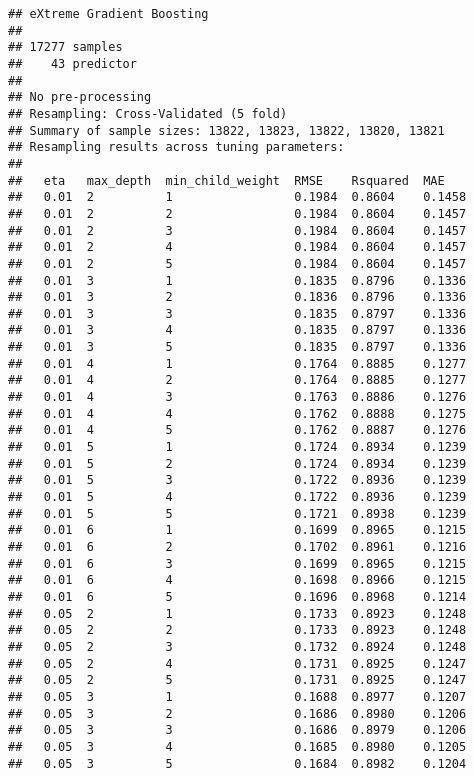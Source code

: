 \documentclass[]{article}
\begin{document}
\begin{verbatim}
## eXtreme Gradient Boosting 
## 
## 17277 samples
##    43 predictor
## 
## No pre-processing
## Resampling: Cross-Validated (5 fold) 
## Summary of sample sizes: 13822, 13823, 13822, 13820, 13821 
## Resampling results across tuning parameters:
## 
##   eta   max_depth  min_child_weight  RMSE    Rsquared  MAE   
##   0.01  2          1                 0.1984  0.8604    0.1458
##   0.01  2          2                 0.1984  0.8604    0.1457
##   0.01  2          3                 0.1984  0.8604    0.1457
##   0.01  2          4                 0.1984  0.8604    0.1457
##   0.01  2          5                 0.1984  0.8604    0.1457
##   0.01  3          1                 0.1835  0.8796    0.1336
##   0.01  3          2                 0.1836  0.8796    0.1336
##   0.01  3          3                 0.1835  0.8797    0.1336
##   0.01  3          4                 0.1835  0.8797    0.1336
##   0.01  3          5                 0.1835  0.8797    0.1336
##   0.01  4          1                 0.1764  0.8885    0.1277
##   0.01  4          2                 0.1764  0.8885    0.1277
##   0.01  4          3                 0.1763  0.8886    0.1276
##   0.01  4          4                 0.1762  0.8888    0.1275
##   0.01  4          5                 0.1762  0.8887    0.1276
##   0.01  5          1                 0.1724  0.8934    0.1239
##   0.01  5          2                 0.1724  0.8934    0.1239
##   0.01  5          3                 0.1722  0.8936    0.1239
##   0.01  5          4                 0.1722  0.8936    0.1239
##   0.01  5          5                 0.1721  0.8938    0.1239
##   0.01  6          1                 0.1699  0.8965    0.1215
##   0.01  6          2                 0.1702  0.8961    0.1216
##   0.01  6          3                 0.1699  0.8965    0.1215
##   0.01  6          4                 0.1698  0.8966    0.1215
##   0.01  6          5                 0.1696  0.8968    0.1214
##   0.05  2          1                 0.1733  0.8923    0.1248
##   0.05  2          2                 0.1733  0.8923    0.1248
##   0.05  2          3                 0.1732  0.8924    0.1248
##   0.05  2          4                 0.1731  0.8925    0.1247
##   0.05  2          5                 0.1731  0.8925    0.1247
##   0.05  3          1                 0.1688  0.8977    0.1207
##   0.05  3          2                 0.1686  0.8980    0.1206
##   0.05  3          3                 0.1686  0.8979    0.1206
##   0.05  3          4                 0.1685  0.8980    0.1205
##   0.05  3          5                 0.1684  0.8982    0.1204

\end{verbatim}
\end{document}
